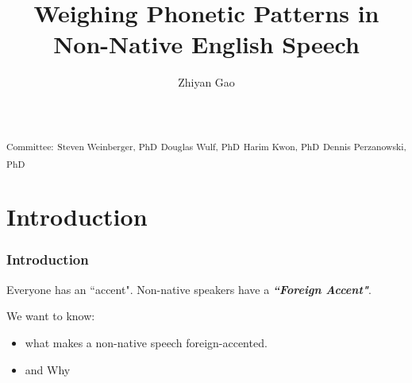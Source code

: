 \documentclass{beamer}
\title[Dissertation Defense Presentation]{ Weighing Phonetic Patterns in Non-Native English Speech} %
\author{Zhiyan Gao} %
\institute[GMU] %
{
George Mason University \\ %
\medskip
\textit{Dissertation Defense 2019} %
}
\date{} %
\begin{document}
\begin{frame}
\titlepage %
\centering
\textsubscript{Committee:}\linebreak
\textsubscript{Steven Weinberger, PhD}\linebreak
\textsubscript{Douglas Wulf, PhD}\linebreak
\textsubscript{Harim Kwon, PhD}\linebreak
\textsubscript{Dennis Perzanowski, PhD}
\end{frame}



\section{Introduction}
\begin{frame}
\frametitle{Introduction}
Everyone has an ``accent".\linebreak\linebreak
Non-native speakers have a \textit{\textbf{``Foreign Accent"}}. \linebreak

We want to know: \linebreak
\begin{itemize}
 \item what makes a non-native speech foreign-accented. \linebreak
 \item and Why
\end{itemize}

\end{frame}
\end{document}
